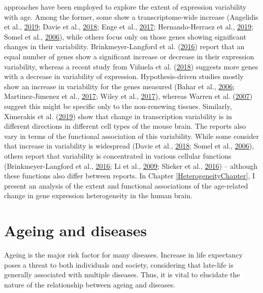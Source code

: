 \documentclass[12pt,twoside]{unicam}
\begin{document}
approaches have been employed to explore the extent of expression variability with age. Among the former, some show a transcriptome-wide increase (Angelidis et al., \protect\hyperlink{ref-Angelidis2019}{2019}; Davie et al., \protect\hyperlink{ref-Davie2018}{2018}; Enge et al., \protect\hyperlink{ref-Enge2017}{2017}; Hernando-Herraez et al., \protect\hyperlink{ref-Hernando-Herraez2019}{2019}; Somel et al., \protect\hyperlink{ref-Somel2006}{2006}), while others focus only on those genes showing significant changes in their variability. Brinkmeyer-Langford et al. (\protect\hyperlink{ref-Brinkmeyer-Langford2016}{2016}) report that an equal number of genes show a significant increase or decrease in their expression variability, whereas a recent study from Viñuela et al. (\protect\hyperlink{ref-Vinuela2018}{2018}) suggests more genes with a decrease in variability of expression. Hypothesis-driven studies mostly show an increase in variability for the genes measured (Bahar et al., \protect\hyperlink{ref-Bahar2006}{2006}; Martinez-Jimenez et al., \protect\hyperlink{ref-Martinez-Jimenez2017}{2017}; Wiley et al., \protect\hyperlink{ref-Wiley2017}{2017}), whereas Warren et al. (\protect\hyperlink{ref-Warren2007}{2007}) suggest this might be specific only to the non-renewing tissues. Similarly, Ximerakis et al. (\protect\hyperlink{ref-Ximerakis2019}{2019}) show that change in transcription variability is in different directions in different cell types of the mouse brain. The reports also vary in terms of the functional association of this variability. While some consider that increase in variability is widespread (Davie et al., \protect\hyperlink{ref-Davie2018}{2018}; Somel et al., \protect\hyperlink{ref-Somel2006}{2006}), others report that variability is concentrated in various cellular functions (Brinkmeyer-Langford et al., \protect\hyperlink{ref-Brinkmeyer-Langford2016}{2016}; Li et al., \protect\hyperlink{ref-Li2009}{2009}; Slieker et al., \protect\hyperlink{ref-Slieker2016}{2016}) -- although these functions also differ between reports. In Chapter \ref{HeterogeneityChapter}, I present an analysis of the extent and functional associations of the age-related change in gene expression heterogeneity in the human brain.

\hypertarget{introAgeingDisease}{%
\section{Ageing and diseases}\label{introAgeingDisease}}

Ageing is the major risk factor for many diseases. Increase in life expectancy poses a threat to both individuals and society, considering that late-life is generally associated with multiple diseases. Thus, it is vital to elucidate the nature of the relationship between ageing and diseases.
\end{document}
